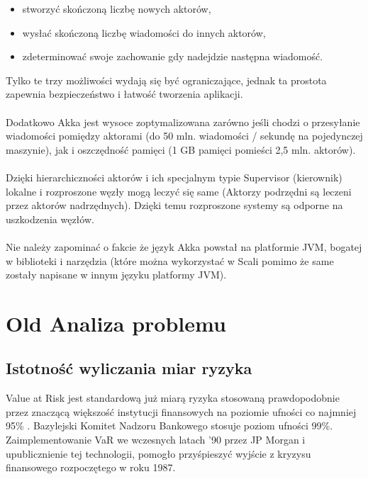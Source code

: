 \documentclass[11pt,titlepage]{article}
\numberwithin{equation}{section}
\begin{document}
\begin{itemize}
  \item stworzyć skończoną liczbę nowych aktorów,
	\item wysłać skończoną liczbę wiadomości do innych aktorów,
	\item zdeterminować swoje zachowanie gdy nadejdzie następna wiadomość.

\end{itemize}
Tylko te trzy możliwości wydają się być ograniczające, jednak ta prostota zapewnia bezpieczeństwo i łatwość tworzenia aplikacji. \\
\\
Dodatkowo Akka jest wysoce zoptymalizowana zarówno jeśli chodzi o przesyłanie wiadomości pomiędzy aktorami (do 50 mln. wiadomości / sekundę na pojedynczej maszynie), jak i oszczędność pamięci (1 GB pamięci pomieści 2,5 mln. aktorów). \\
\\
Dzięki hierarchiczności aktorów i ich specjalnym typie Supervisor (kierownik) lokalne i rozproszone węzły mogą leczyć się same (Aktorzy podrzędni są leczeni przez aktorów nadrzędnych). Dzięki temu rozproszone systemy są odporne na uszkodzenia węzłów. \\
\\
Nie należy zapominać o fakcie że język Akka powstał na platformie JVM, bogatej w biblioteki i narzędzia (które można wykorzystać w Scali pomimo że same zostały napisane w innym języku platformy JVM).\\

\newpage
\section{Old Analiza problemu}



\subsection{Istotność wyliczania miar ryzyka}
Value at Risk jest standardową już miarą ryzyka stosowaną prawdopodobnie przez znaczącą większość instytucji finansowych na poziomie ufności co najmniej 95\% . Bazylejski Komitet Nadzoru Bankowego stosuje poziom ufności 99\%. Zaimplementowanie VaR we wczesnych latach '90 przez JP Morgan i upublicznienie tej technologii, pomogło przyśpieszyć wyjście z kryzysu finansowego rozpoczętego w roku 1987.\\
\\
\end{document}
